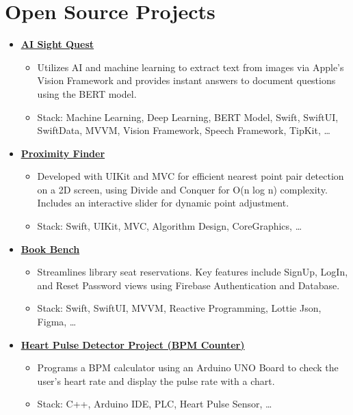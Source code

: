 \documentclass[letter,12pt]{article}
\newcommand{\customsquare}{\raisebox{0.25ex}{\scalebox{0.45}{$\blacksquare$}}}
\begin{document}
\pagebreak

\section*{Open Source Projects}
\begin{itemize}[label={\customsquare}]
    \item \href{https://github.com/nsswifter/AISightQuest}{\underline{\textbf{AI Sight Quest}}}
    \begin{itemize}
        \item Utilizes AI and machine learning to extract text from images via Apple's \mbox{Vision} Framework and provides instant answers to document questions using the BERT model.
        \item Stack: Machine Learning, Deep Learning, BERT Model, Swift, SwiftUI, SwiftData, MVVM, \mbox{Vision} Framework, Speech Framework, TipKit, …
    \end{itemize}

    \item \href{https://github.com/nsswifter/ProximityFinder}{\underline{\textbf{Proximity Finder}}}
    \begin{itemize}
        \item Developed with UIKit and MVC for efficient nearest point pair detection on a 2D screen, using Divide and Conquer for O(n log n) complexity. Includes an interactive slider for dynamic point adjustment.
        \item Stack: Swift, UIKit, MVC, Algorithm Design, CoreGraphics, … 
    \end{itemize}

    \item \href{https://github.com/nsswifter/BookBench}{\underline{\textbf{Book Bench}}}
    \begin{itemize}
        \item Streamlines library seat reservations. Key features include SignUp, LogIn, and Reset Password views using Firebase Authentication and Database.
        \item Stack: Swift, SwiftUI, MVVM, Reactive Programming, Lottie Json, Figma, …
    \end{itemize}

    \item \href{https://github.com/nsswifter/Heart-Pulse-Detector-Using-Arduino}{\underline{\textbf{Heart Pulse Detector Project (BPM Counter)}}}
    \begin{itemize}
        \item Programs a BPM calculator using an Arduino UNO Board to check the user's heart rate and display the pulse rate with a chart.
        \item Stack: C++, Arduino IDE, PLC, Heart Pulse Sensor, …
    \end{itemize}


\end{itemize}
\end{document}
